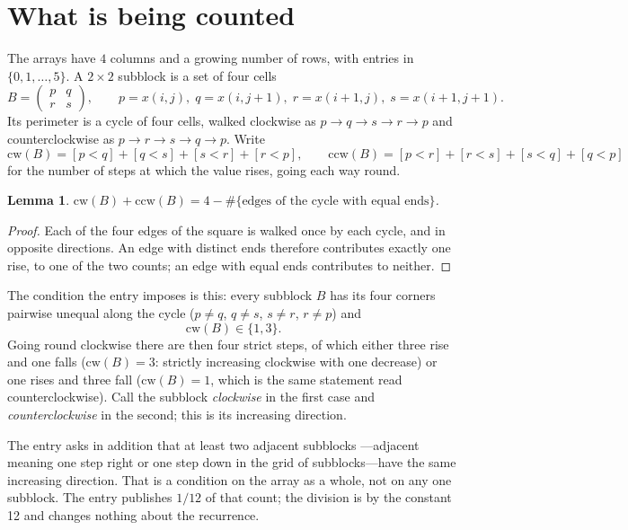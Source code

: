 \documentclass[11pt,a4paper]{article}
\theoremstyle{plain}
\newtheorem{lemma}[theorem]{Lemma}
\theoremstyle{definition}
\begin{document}
\section{What is being counted}

The arrays have $4$ columns and a growing number of rows, with entries in $\{0,1,\dots,5\}$. A
$2\times2$ subblock is a set of four cells
\[
B=\begin{pmatrix} p & q \\ r & s \end{pmatrix},
\qquad p=x(i,j),\; q=x(i,j+1),\; r=x(i+1,j),\; s=x(i+1,j+1).
\]
Its perimeter is a cycle of four cells, walked clockwise as $p\to q\to s\to r\to p$ and
counterclockwise as $p\to r\to s\to q\to p$. Write
\[
\mathrm{cw}(B)=[p<q]+[q<s]+[s<r]+[r<p],\qquad
\mathrm{ccw}(B)=[p<r]+[r<s]+[s<q]+[q<p]
\]
for the number of steps at which the value rises, going each way round.

\begin{lemma}\label{lem:sum}
$\mathrm{cw}(B)+\mathrm{ccw}(B)=4-\#\{\text{edges of the cycle with equal ends}\}$.
\end{lemma}

\begin{proof}
Each of the four edges of the square is walked once by each cycle, and in opposite directions.
An edge with distinct ends therefore contributes exactly one rise, to one of the two counts;
an edge with equal ends contributes to neither.
\end{proof}

The condition the entry imposes is this: every subblock $B$ has its four corners pairwise unequal along the cycle ($p\ne q$, $q\ne s$, $s\ne r$, $r\ne p$) and
\[
\mathrm{cw}(B)\in\{1,3\}.
\]
Going round clockwise there are then four strict steps, of which either three rise and one falls ($\mathrm{cw}(B)=3$: strictly increasing clockwise with one decrease) or one rises and three fall ($\mathrm{cw}(B)=1$, which is the same statement read counterclockwise). Call the subblock \emph{clockwise} in the first case and \emph{counterclockwise} in the second; this is its increasing direction.

The entry asks in addition that at least two adjacent subblocks ---adjacent meaning one step right or one step down in the grid of subblocks---have the same increasing direction. That is a condition on the array as a whole, not on any one subblock. The entry publishes $1/12$ of that count; the division is by the constant 12 and changes nothing about the recurrence.
\end{document}
